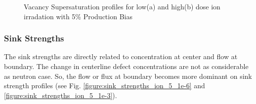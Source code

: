 \documentclass[a4paper]{article}
\begin{document}
\begin{figure}[h!]
        \caption{Vacancy Supersaturation profiles for low(a) and high(b) dose ion irradation with 5\% Production Bias}
        \label{figure:vacancy_supersaturation_ion_5}
      \end{figure}
      \newpage
    \subsubsection{Sink Strengths} \hspace{10pt}
    The sink strengths are directly related to concentration at center and flow at boundary. The change in centerline defect concentrations are not as considerable as neutron case. So, the flow or flux at boundary becomes more dominant on sink strength profiles (see Fig. \ref{figure:sink_strengths_ion_5_1e-6} and \ref{figure:sink_strengths_ion_5_1e-3}).
\end{document}

